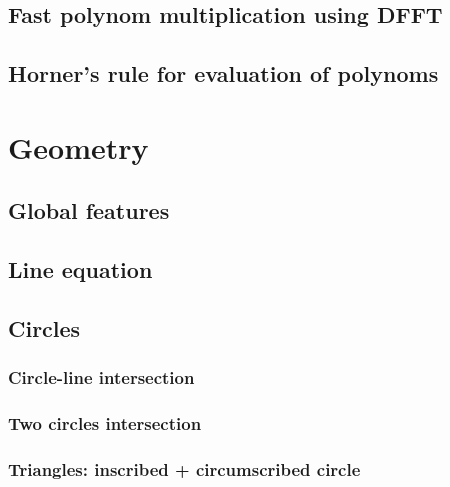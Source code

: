 \documentclass[a4paper]{article}
\begin{document}
\begin{multicols*}{2}
    \subsection{Fast polynom multiplication using DFFT}
        
    \subsection{Horner's rule for evaluation of polynoms}
        

\section{Geometry}
    \subsection{Global features}
        
    \subsection{Line equation}
        
    \subsection{Circles}
        \subsubsection{Circle-line intersection}
            
        \subsubsection{Two circles intersection}
            
        \subsubsection{Triangles: inscribed + circumscribed circle}
            

\end{multicols*}
\end{document}
